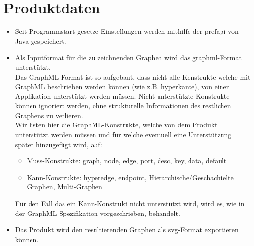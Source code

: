 \chapter{Produktdaten}\label{ch:daten}

\begin{itemize}
  \item Seit Programmstart gesetze Einstellungen werden mithilfe der \gls{prefapi} von Java gespeichert.
  \item Als Inputformat für die zu zeichnenden Graphen wird das \gls{graphml}-Format unterstützt.\\
    Das GraphML-Format ist so aufgebaut, dass nicht alle Konstrukte welche mit GraphML beschrieben werden können (wie z.B. \gls{hyperkante}),
    von einer Applikation unterstützt werden müssen.
    Nicht unterstützte Konstrukte können ignoriert werden, ohne strukturelle Informationen des restlichen Graphens zu verlieren.\\
    Wir listen hier die GraphML-Konstrukte, welche von dem Produkt unterstützt werden müssen und für welche eventuell eine Unterstützung später hinzugefügt wird, auf:
    \begin{itemize}
      \item Muss-Konstrukte: graph, node, edge, port, desc, key, data, default %
      \item Kann-Konstrukte: hyperedge, endpoint, Hierarchische/Geschachtelte Graphen,  Multi-Graphen
    \end{itemize}
    Für den Fall das ein Kann-Konstrukt nicht unterstützt wird, wird es, wie in der GraphML Spezifikation vorgeschrieben, behandelt.
  \item Das Produkt wird den resultierenden Graphen als \gls{svg}-Format exportieren können.
\end{itemize}
